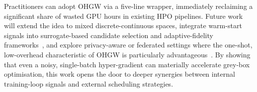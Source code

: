\documentclass{article}
\begin{document}
Practitioners can adopt OHGW via a five-line wrapper, immediately reclaiming a significant share of wasted GPU hours in existing HPO pipelines. Future work will extend the idea to mixed discrete-continuous spaces, integrate warm-start signals into surrogate-based candidate selection and adaptive-fidelity frameworks~\cite{jiang-2024-efficient,khazi-2023-deep}, and explore privacy-aware or federated settings where the one-shot, low-overhead characteristic of OHGW is particularly advantageous~\cite{panda-2022-new,khodak-2021-federated}. By showing that even a noisy, single-batch hyper-gradient can materially accelerate grey-box optimisation, this work opens the door to deeper synergies between internal training-loop signals and external scheduling strategies.




\end{document}

